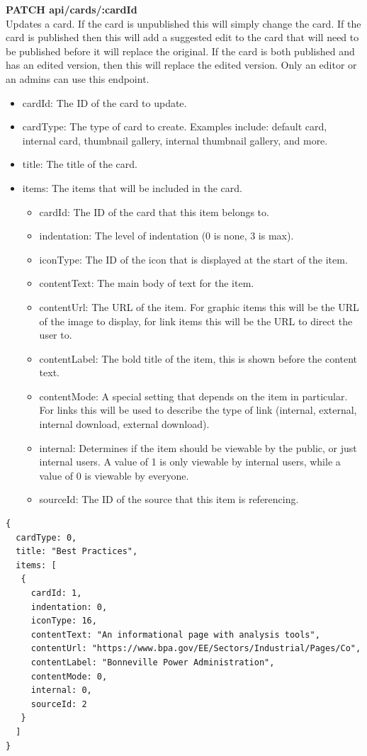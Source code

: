 \documentclass[onecolumn, draftclsnofoot,10pt, compsoc, usenames, dvipsnames]{IEEEtran}
\begin{document}
\noindent
\textbf{\textcolor{BlueGreen}{PATCH} api/cards/:cardId} \\
Updates a card. If the card is unpublished this will simply change the card. If the card is published then this will add a suggested edit to the card that will need to be published before it will replace the original. If the card is both published and has an edited version, then this will replace the edited version. Only an editor or an admins can use this endpoint.
\begin{itemize}
    \item cardId: The ID of the card to update.
    \item cardType: The type of card to create. Examples include: default card, internal card, thumbnail gallery, internal thumbnail gallery, and more.
    \item title: The title of the card.
    \item items: The items that will be included in the card.
    \begin{itemize}
        \item cardId: The ID of the card that this item belongs to.
        \item indentation: The level of indentation (0 is none, 3 is max).
        \item iconType: The ID of the icon that is displayed at the start of the item.
        \item contentText: The main body of text for the item.
        \item contentUrl: The URL of the item. For graphic items this will be the URL of the image to display, for link items this will be the URL to direct the user to.
        \item contentLabel: The bold title of the item, this is shown before the content text.
        \item contentMode: A special setting that depends on the item in particular. For links this will be used to describe the type of link (internal, external, internal download, external download).
        \item internal: Determines if the item should be viewable by the public, or just internal users. A value of 1 is only viewable by internal users, while a value of 0 is viewable by everyone.
        \item sourceId: The ID of the source that this item is referencing.
    \end{itemize}
\end{itemize}
\begin{lstlisting}[caption=Example Request Body]
{
  cardType: 0,
  title: "Best Practices",
  items: [
   {
     cardId: 1,
     indentation: 0,
     iconType: 16,
     contentText: "An informational page with analysis tools",
     contentUrl: "https://www.bpa.gov/EE/Sectors/Industrial/Pages/Co",
     contentLabel: "Bonneville Power Administration",
     contentMode: 0,
     internal: 0,
     sourceId: 2
   }
  ]
}
\end{lstlisting}
\end{document}

